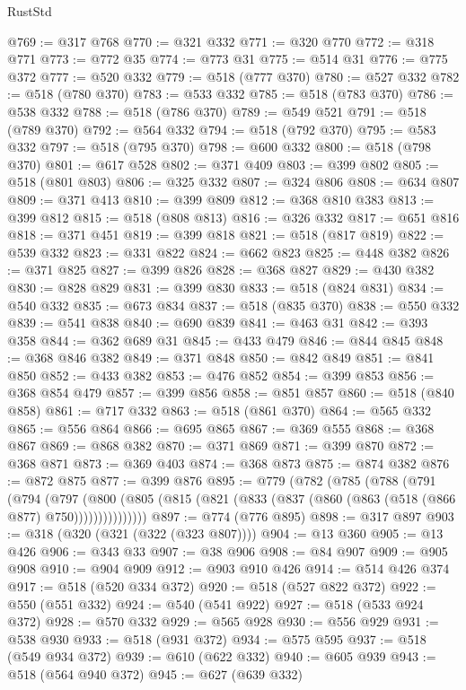 \begin{lexlean}{RustStd}
\begin{coremodule}
@769 := @317 @768
@770 := @321 @332
@771 := @320 @770
@772 := @318 @771
@773 := @772 @35
@774 := @773 @31
@775 := @514 @31
@776 := @775 @372
@777 := @520 @332
@779 := @518 (@777 @370)
@780 := @527 @332
@782 := @518 (@780 @370)
@783 := @533 @332
@785 := @518 (@783 @370)
@786 := @538 @332
@788 := @518 (@786 @370)
@789 := @549 @521
@791 := @518 (@789 @370)
@792 := @564 @332
@794 := @518 (@792 @370)
@795 := @583 @332
@797 := @518 (@795 @370)
@798 := @600 @332
@800 := @518 (@798 @370)
@801 := @617 @528
@802 := @371 @409
@803 := @399 @802
@805 := @518 (@801 @803)
@806 := @325 @332
@807 := @324 @806
@808 := @634 @807
@809 := @371 @413
@810 := @399 @809
@812 := @368 @810 @383
@813 := @399 @812
@815 := @518 (@808 @813)
@816 := @326 @332
@817 := @651 @816
@818 := @371 @451
@819 := @399 @818
@821 := @518 (@817 @819)
@822 := @539 @332
@823 := @331 @822
@824 := @662 @823
@825 := @448 @382
@826 := @371 @825
@827 := @399 @826
@828 := @368 @827
@829 := @430 @382
@830 := @828 @829
@831 := @399 @830
@833 := @518 (@824 @831)
@834 := @540 @332
@835 := @673 @834
@837 := @518 (@835 @370)
@838 := @550 @332
@839 := @541 @838
@840 := @690 @839
@841 := @463 @31
@842 := @393 @358
@844 := @362 @689 @31
@845 := @433 @479
@846 := @844 @845
@848 := @368 @846 @382
@849 := @371 @848
@850 := @842 @849
@851 := @841 @850
@852 := @433 @382
@853 := @476 @852
@854 := @399 @853
@856 := @368 @854 @479
@857 := @399 @856
@858 := @851 @857
@860 := @518 (@840 @858)
@861 := @717 @332
@863 := @518 (@861 @370)
@864 := @565 @332
@865 := @556 @864
@866 := @695 @865
@867 := @369 @555
@868 := @368 @867
@869 := @868 @382
@870 := @371 @869
@871 := @399 @870
@872 := @368 @871
@873 := @369 @403
@874 := @368 @873
@875 := @874 @382
@876 := @872 @875
@877 := @399 @876
@895 := @779
    (@782
      (@785
        (@788
          (@791
            (@794
              (@797
                (@800
                  (@805 (@815 (@821 (@833 (@837 (@860 (@863 (@518 (@866 @877) @750)))))))))))))))
@897 := @774 (@776 @895)
@898 := @317 @897
@903 := @318 (@320 (@321 (@322 (@323 @807))))
@904 := @13 @360
@905 := @13 @426
@906 := @343 @33
@907 := @38 @906
@908 := @84 @907
@909 := @905 @908
@910 := @904 @909
@912 := @903 @910 @426
@914 := @514 @426 @374
@917 := @518 (@520 @334 @372)
@920 := @518 (@527 @822 @372)
@922 := @550 (@551 @332)
@924 := @540 (@541 @922)
@927 := @518 (@533 @924 @372)
@928 := @570 @332
@929 := @565 @928
@930 := @556 @929
@931 := @538 @930
@933 := @518 (@931 @372)
@934 := @575 @595
@937 := @518 (@549 @934 @372)
@939 := @610 (@622 @332)
@940 := @605 @939
@943 := @518 (@564 @940 @372)
@945 := @627 (@639 @332)

\end{coremodule}
\end{lexlean}
